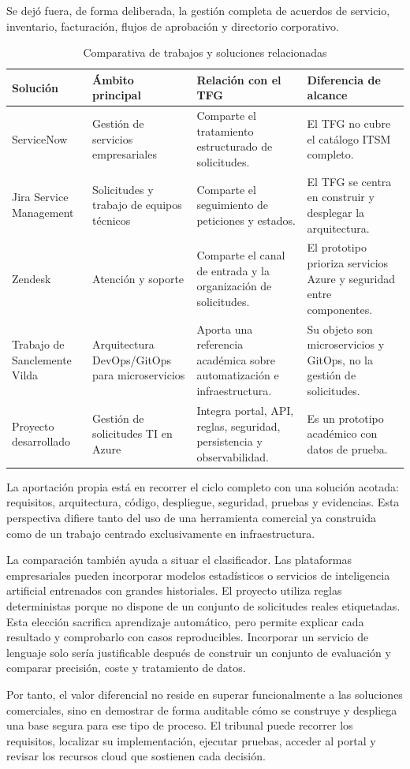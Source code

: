 Se dejó fuera, de forma deliberada, la gestión completa de acuerdos de servicio, inventario, facturación, flujos de aprobación y directorio corporativo.

\begin{table}[h]
\centering
\small
\begin{tabularx}{\textwidth}{l X X X}
\textbf{Solución} & \textbf{Ámbito principal} & \textbf{Relación con el TFG} & \textbf{Diferencia de alcance} \\
\hline
ServiceNow & Gestión de servicios empresariales & Comparte el tratamiento estructurado de solicitudes. & El TFG no cubre el catálogo ITSM completo. \\
Jira Service Management & Solicitudes y trabajo de equipos técnicos & Comparte el seguimiento de peticiones y estados. & El TFG se centra en construir y desplegar la arquitectura. \\
Zendesk & Atención y soporte & Comparte el canal de entrada y la organización de solicitudes. & El prototipo prioriza servicios Azure y seguridad entre componentes. \\
Trabajo de Sanclemente Vilda & Arquitectura DevOps/GitOps para microservicios & Aporta una referencia académica sobre automatización e infraestructura. & Su objeto son microservicios y GitOps, no la gestión de solicitudes. \\
Proyecto desarrollado & Gestión de solicitudes TI en Azure & Integra portal, API, reglas, seguridad, persistencia y observabilidad. & Es un prototipo académico con datos de prueba. \\
\end{tabularx}
\caption{Comparativa de trabajos y soluciones relacionadas}
\end{table}

La aportación propia está en recorrer el ciclo completo con una solución acotada: requisitos, arquitectura, código, despliegue, seguridad, pruebas y evidencias. Esta perspectiva difiere tanto del uso de una herramienta comercial ya construida como de un trabajo centrado exclusivamente en infraestructura.

La comparación también ayuda a situar el clasificador. Las plataformas empresariales pueden incorporar modelos estadísticos o servicios de inteligencia artificial entrenados con grandes historiales. El proyecto utiliza reglas deterministas porque no dispone de un conjunto de solicitudes reales etiquetadas. Esta elección sacrifica aprendizaje automático, pero permite explicar cada resultado y comprobarlo con casos reproducibles. Incorporar un servicio de lenguaje solo sería justificable después de construir un conjunto de evaluación y comparar precisión, coste y tratamiento de datos.

Por tanto, el valor diferencial no reside en superar funcionalmente a las soluciones comerciales, sino en demostrar de forma auditable cómo se construye y despliega una base segura para ese tipo de proceso. El tribunal puede recorrer los requisitos, localizar su implementación, ejecutar pruebas, acceder al portal y revisar los recursos cloud que sostienen cada decisión.

